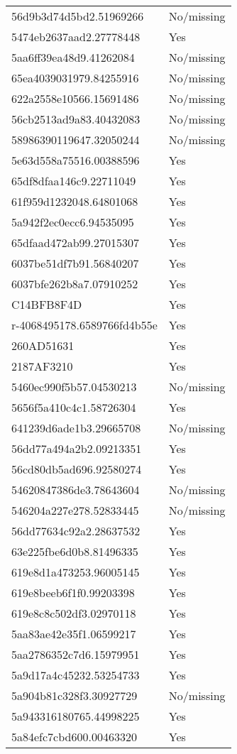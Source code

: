 \begin{tabular}{ll}
56d9b3d74d5bd2.51969266 & No/missing \\
5474eb2637aad2.27778448 & Yes \\
5aa6ff39ea48d9.41262084 & No/missing \\
65ea4039031979.84255916 & No/missing \\
622a2558e10566.15691486 & No/missing \\
56cb2513ad9a83.40432083 & No/missing \\
58986390119647.32050244 & No/missing \\
5e63d558a75516.00388596 & Yes \\
65df8dfaa146c9.22711049 & Yes \\
61f959d1232048.64801068 & Yes \\
5a942f2ec0ecc6.94535095 & Yes \\
65dfaad472ab99.27015307 & Yes \\
6037be51df7b91.56840207 & Yes \\
6037bfe262b8a7.07910252 & Yes \\
C14BFB8F4D & Yes \\
r-4068495178.6589766fd4b55e & Yes \\
260AD51631 & Yes \\
2187AF3210 & Yes \\
5460ec990f5b57.04530213 & No/missing \\
5656f5a410c4c1.58726304 & Yes \\
641239d6ade1b3.29665708 & No/missing \\
56dd77a494a2b2.09213351 & Yes \\
56cd80db5ad696.92580274 & Yes \\
54620847386de3.78643604 & No/missing \\
546204a227e278.52833445 & No/missing \\
56dd77634c92a2.28637532 & Yes \\
63e225fbe6d0b8.81496335 & Yes \\
619e8d1a473253.96005145 & Yes \\
619e8beeb6f1f0.99203398 & Yes \\
619e8c8c502df3.02970118 & Yes \\
5aa83ae42e35f1.06599217 & Yes \\
5aa2786352c7d6.15979951 & Yes \\
5a9d17a4c45232.53254733 & Yes \\
5a904b81c328f3.30927729 & No/missing \\
5a943316180765.44998225 & Yes \\
5a84efc7cbd600.00463320 & Yes \\

\end{tabular}
